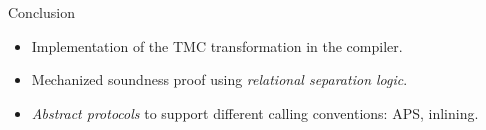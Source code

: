 \begin{frame}{Conclusion}
\Large
\begin{itemize}
  \setlength\itemsep{1.5em}
  \item Implementation of the TMC transformation in the \OCaml compiler.
  \item Mechanized soundness proof using \emph{relational separation logic}.
  \item \emph{Abstract protocols} to support different calling conventions: APS, inlining.
\end{itemize}
\end{frame}
